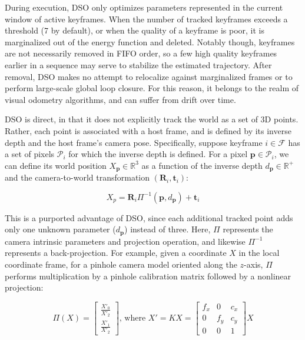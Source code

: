 During execution, DSO only optimizes parameters represented in the current window of active keyframes. When the number of tracked keyframes exceeds a threshold (7 by default), or when the quality of a keyframe is poor, it is marginalized out of the energy function and deleted. Notably though, keyframes are not necessarily removed in FIFO order, so a few high quality keyframes earlier in a sequence may serve to stabilize the estimated trajectory. After removal, DSO makes no attempt to relocalize against marginalized frames or to perform large-scale global loop closure. For this reason, it belongs to the realm of visual odometry algorithms, and can suffer from drift over time.

DSO is direct, in that it does not explicitly track the world as a set of 3D points. Rather, each point is associated with a host frame, and is defined by its inverse depth and the host frame's camera pose. Specifically, suppose keyframe $i \in \mathcal{F}$ has a set of pixels $\mathcal{P}_i$ for which the inverse depth is defined. For a pixel $\boldsymbol{p} \in \mathcal{P}_i$, we can define its world position $X_{\boldsymbol{p}} \in\mathbb{R}^3$ as a function of the inverse depth $d_{\boldsymbol{p}} \in \mathbb{R}^+$ and the camera-to-world transformation $(\boldsymbol{R}_i, \boldsymbol{t}_i)$:

\begin{equation}
X_p = \boldsymbol{R}_i \Pi^{-1}(\boldsymbol{p}, d_{\boldsymbol{p}}) + \boldsymbol{t}_i
\end{equation}

This is a purported advantage of DSO, since each additional tracked point adds only one unknown parameter ($d_{\boldsymbol{p}}$) instead of three. Here, $\Pi$ represents the camera intrinsic parameters and projection operation, and likewise $\Pi^{-1}$ represents a back-projection. For example, given a coordinate $X$ in the local coordinate frame, for a pinhole camera model oriented along the $z$-axis, $\Pi$ performs multiplication by a pinhole calibration matrix followed by a nonlinear projection:

\begin{equation}
\Pi(X) = 
\begin{bmatrix}
\frac{X'_0}{X'_2} \\
\frac{X'_1}{X'_2}
\end{bmatrix}
\text{, where } X' = KX =
\begin{bmatrix}
f_x & 0 & c_x \\
0 & f_y & c_y \\
0 & 0 & 1
\end{bmatrix} X
\end{equation}

